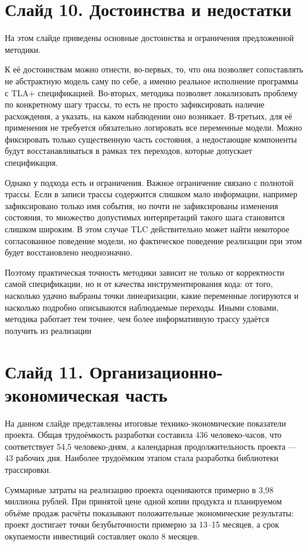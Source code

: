 \documentclass[12pt,a4paper]{article}
\begin{document}
\section*{Слайд 10. Достоинства и недостатки}

На этом слайде приведены основные достоинства и ограничения
предложенной методики.

К её достоинствам можно отнести, во-первых, то, что она позволяет
сопоставлять не абстрактную модель саму по себе, а именно реальное
исполнение программы с TLA+ спецификацией. Во-вторых, методика
позволяет локализовать проблему по конкретному шагу трассы, то есть
не просто зафиксировать наличие расхождения, а указать, на каком
наблюдении оно возникает. В-третьих, для её применения не требуется
обязательно логировать все переменные модели. Можно фиксировать только
существенную часть состояния, а недостающие компоненты будут
восстанавливаться в рамках тех переходов, которые допускает
спецификация.

Однако у подхода есть и ограничения. Важное ограничение связано с полнотой
трассы. Если в записи трассы содержится слишком мало информации, например
зафиксировано только имя события, но почти не зафиксированы изменения
состояния, то множество допустимых интерпретаций такого шага становится слишком
широким. В этом случае TLC действительно может найти некоторое согласованное
поведение модели, но фактическое поведение реализации при этом будет
восстановлено неоднозначно.

Поэтому практическая точность методики зависит не только от
корректности самой спецификации, но и от качества инструментирования
кода: от того, насколько удачно выбраны точки линеаризации, какие
переменные логируются и насколько подробно описываются наблюдаемые
переходы. Иными словами, методика работает тем точнее, чем более
информативную трассу удаётся получить из реализации

\section*{Слайд 11. Организационно-экономическая часть}

На данном слайде представлены итоговые технико-экономические
показатели проекта. Общая трудоёмкость разработки составила
436 человеко-часов, что соответствует 54,5 человеко-дням, а
календарная продолжительность проекта — 43 рабочих дня. Наиболее
трудоёмким этапом стала разработка библиотеки трассировки.

Суммарные затраты на реализацию проекта оцениваются примерно в
3,98 миллиона рублей. При принятой цене одной копии продукта и
планируемом объёме продаж расчёты показывают положительные
экономические результаты: проект достигает точки безубыточности
примерно за 13–15 месяцев, а срок окупаемости инвестиций составляет
около 8 месяцев.
\end{document}
